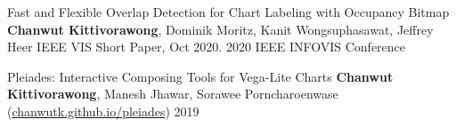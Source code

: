 \begin{cvpubs}
  \cvpub
    {Fast and Flexible Overlap Detection for Chart Labeling with Occupancy Bitmap} %
    {\textbf{Chanwut Kittivorawong}, Dominik Moritz, Kanit Wongsuphasawat, Jeffrey Heer IEEE VIS Short Paper, Oct 2020.} %
    {2020} %
    {IEEE INFOVIS Conference} %

  \cvpub
    {Pleiades: Interactive Composing Tools for Vega-Lite Charts} %
    {\textbf{Chanwut Kittivorawong}, Manesh Jhawar, Sorawee Porncharoenwase (\href{https://chanwutk.github.io/pleiades}{chanwutk.github.io/pleiades})} %
    {2019} %
    {} %
\end{cvpubs}
